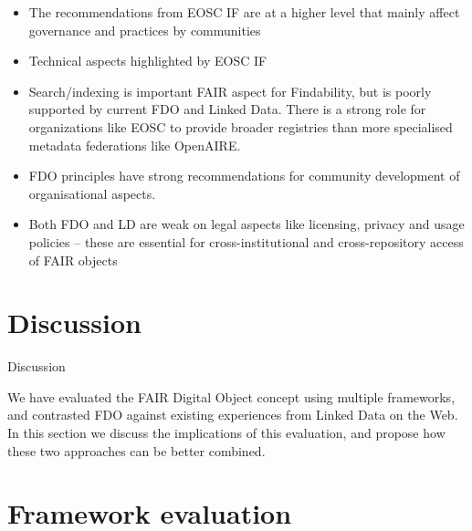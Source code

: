 \begin{itemize}
\tightlist
\item
  The recommendations from EOSC IF are at a higher level that mainly affect governance and practices by communities
\item
  Technical aspects highlighted by EOSC IF
\item
  Search/indexing is important FAIR aspect for Findability, but is poorly supported by current FDO and Linked Data. There is a strong role for organizations like EOSC to provide broader registries than more specialised metadata federations like OpenAIRE.
\item
  FDO principles have strong recommendations for community development of organisational aspects.
\item
  Both FDO and LD are weak on legal aspects like licensing, privacy and usage policies -- these are essential for cross-institutional and cross-repository access of FAIR objects
\end{itemize}

\hypertarget{sec:discussion}{%
\section{Discussion}\label{sec:discussion}}

Discussion

We have evaluated the FAIR Digital Object concept using multiple
frameworks, and contrasted FDO against existing experiences from Linked
Data on the Web. In this section we discuss the implications of this
evaluation, and propose how these two approaches can be better combined.

\hypertarget{framework-evaluation}{%
\section*{Framework evaluation}\label{framework-evaluation}}

